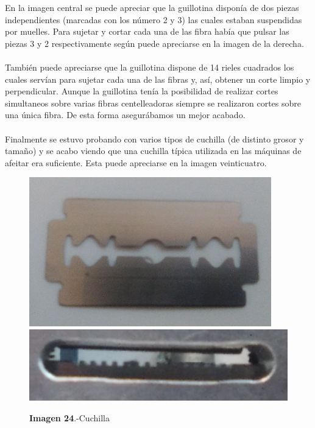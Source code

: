 En la imagen central se puede apreciar que la guillotina disponía de dos piezas independientes (marcadas con los número 2 y 3) las cuales estaban suspendidas por muelles. Para sujetar y cortar cada una de las fibra había que pulsar las piezas 3 y 2 respectivamente según puede apreciarse en la imagen de la derecha. 

\paragraph {} 
También puede apreciarse que la guillotina dispone de 14 rieles cuadrados los cuales servían para sujetar cada una de las fibras y, así, obtener un corte limpio y perpendicular. Aunque la guillotina tenía la posibilidad de realizar cortes simultaneos sobre varias fibras centelleadoras siempre se realizaron cortes sobre una única fibra. De esta forma asegurábamos un mejor acabado.


\paragraph {}
Finalmente se estuvo probando con varios tipos de cuchilla (de distinto grosor y tamaño) y se acabo viendo que una cuchilla típica utilizada en las máquinas de afeitar era suficiente. Esta puede apreciarse en la imagen veinticuatro.

\begin{figure}[htb]
\centering
{
\includegraphics[scale=0.3]{cuchilla.png} 
}
{
\includegraphics[scale=0.3]{Guillotina5.png} 
}
\caption{\textbf{Imagen 24}.-Cuchilla}
\end{figure} 

